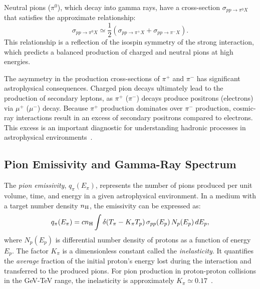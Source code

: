Neutral pions (\(\pi^0\)), which decay into gamma rays, have a cross-section \(\sigma_{pp \rightarrow \pi^0 X}\) that satisfies the approximate relationship:
%
\begin{equation}
\sigma_{pp \rightarrow \pi^0 X} \simeq \frac{1}{2} \left( \sigma_{pp \rightarrow \pi^+ X} + \sigma_{pp \rightarrow \pi^- X} \right).
\end{equation}
%
This relationship is a reflection of the isospin symmetry of the strong interaction, which predicts a balanced production of charged and neutral pions at high energies.  

The asymmetry in the production cross-sections of \(\pi^+\) and \(\pi^-\) has significant astrophysical consequences. Charged pion decays ultimately lead to the production of secondary leptons, as \(\pi^+ \) (\(\pi^- \)) decays produce positrons (electrons) via \(\mu^+\) (\(\mu^-\)) decay.  
%
Because \(\pi^+\) production dominates over \(\pi^-\) production, cosmic-ray interactions result in an excess of secondary positrons compared to electrons. This excess is an important diagnostic for understanding hadronic processes in astrophysical environments~\cite{Moskalenko1998apj}.  

\subsection{Pion Emissivity and Gamma-Ray Spectrum}


The \emph{pion emissivity}, \(q_\pi(E_\pi)\), represents the number of pions produced per unit volume, time, and energy in a given astrophysical environment.
%
In a medium with a target number density \(n_{\rm H}\), the emissivity can be expressed as:
\begin{equation}\label{eq:qpi}
q_\pi(E_\pi) = c n_{\rm H} \int \delta(T_\pi - K_\pi T_p) \, \sigma_{pp}(E_p) \, N_p(E_p) \, dE_p,
\end{equation}
%
where \(N_p(E_p)\) is differential number density of protons as a function of energy \(E_p\).
%
The factor \(K_\pi\) is a dimensionless constant called the \emph{inelasticity}. It quantifies the \emph{average} fraction of the initial proton's energy lost during the interaction and transferred to the produced pions. For pion production in proton-proton collisions in the GeV-TeV range, the inelasticity is approximately \( K_\pi \simeq 0.17 \)~.

